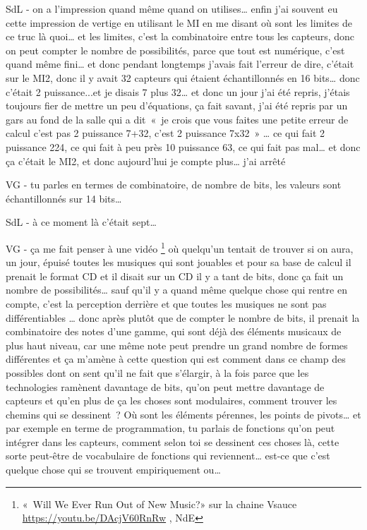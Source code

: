 SdL - on a l'impression quand même quand on utilises… enfin j'ai souvent eu cette impression de vertige en utilisant le MI en me disant où sont les limites de ce truc là quoi… et les limites, c'est la combinatoire entre tous les capteurs, donc on peut compter le nombre de possibilités, parce que tout est numérique, c'est quand même fini… et donc pendant longtemps j'avais fait l'erreur de dire, c'était sur le MI2, donc il y avait 32 capteurs qui étaient échantillonnés en 16 bits… donc c'était 2 puissance...et je disais 7 plus 32… et donc un jour j'ai été repris, j'étais toujours fier de mettre un peu d'équations, ça fait savant, j'ai été repris par un gars au fond de la salle qui a dit « je crois que vous faites une petite erreur de calcul c'est pas 2 puissance 7+32, c'est 2 puissance 7x32 » … ce qui fait 2 puissance 224, ce qui fait à peu près 10 puissance 63, ce qui fait pas mal… et donc ça c'était le MI2, et donc aujourd'hui je compte plus… j'ai arrêté 

VG - tu parles en termes de combinatoire, de nombre de bits, les valeurs sont échantillonnés sur 14 bits… 

SdL - à ce moment là c'était sept… 

VG - ça me fait penser à une vidéo \footnote{« Will We Ever Run Out of New Music?» sur la chaine Vsauce \url{https://youtu.be/DAcjV60RnRw} , NdE} où quelqu'un tentait de trouver si on aura, un jour, épuisé toutes les musiques qui sont jouables et pour sa base de calcul il prenait le format CD et il disait sur un CD il y a tant de bits, donc ça fait un nombre de possibilités… sauf qu'il y a quand même quelque chose qui rentre en compte, c'est la perception derrière et que toutes les musiques ne sont pas différentiables … donc après plutôt que de compter le nombre de bits, il prenait la combinatoire des notes d'une gamme, qui sont déjà des éléments musicaux de plus haut niveau, car une même note peut prendre un grand nombre de formes différentes et ça m'amène à cette question qui est comment dans ce champ des possibles dont on sent qu'il ne fait que s'élargir, à la fois parce que les technologies ramènent davantage de bits, qu'on peut mettre davantage de capteurs et qu'en plus de ça les choses sont modulaires, comment trouver les chemins qui se dessinent ? Où sont les éléments pérennes, les points de pivots… et par exemple en terme de programmation, tu parlais de fonctions qu'on peut intégrer dans les capteurs, comment selon toi se dessinent ces choses là, cette sorte peut-être de vocabulaire de fonctions qui reviennent… est-ce que c'est quelque chose qui se trouvent empiriquement ou…  


